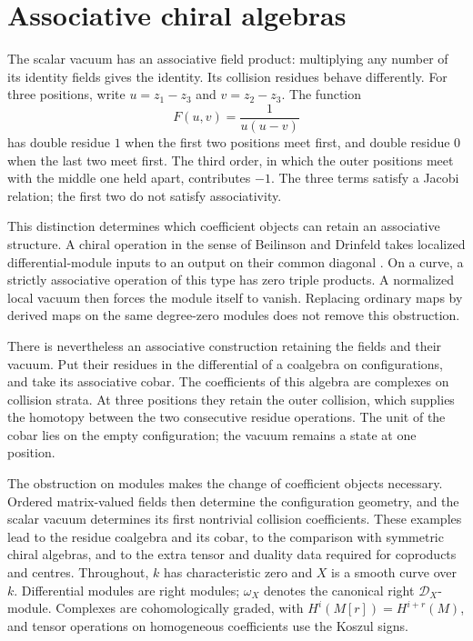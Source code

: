 \chapter{Associative chiral algebras}
\label{e1f:chapter}

The scalar vacuum has an associative field product: multiplying
any number of its identity fields gives the identity. Its collision
residues\label{e1f:def:scalar-three-point-coordinates} behave differently. For three positions, write
\(u=z_1-z_3\) and \(v=z_2-z_3\). The function
\[
 F(u,v)=\frac1{u(u-v)}
\]
has double residue \(1\) when the first two positions meet first,
and double residue \(0\) when the last two meet first. The third
order, in which the outer positions meet with the middle one held
apart, contributes \(-1\). The three terms satisfy a Jacobi
relation; the first two do not satisfy associativity.

This distinction determines which coefficient objects can retain
an associative structure. A chiral operation in the sense of Beilinson and
Drinfeld takes localized differential-module inputs to an output
on their common diagonal \cite{chhop:BD}. On a curve, a strictly
associative operation of this type has zero triple products.
A normalized local vacuum then forces the module itself to vanish.
Replacing ordinary maps by derived maps on the same degree-zero
modules does not remove this obstruction.

There is nevertheless an associative construction retaining the
fields and their vacuum. Put their residues in the differential
of a coalgebra on configurations, and take its associative cobar.
The coefficients of this algebra are complexes on collision
strata. At three positions they retain the outer collision,
which supplies the homotopy between the two consecutive residue
operations. The unit of the cobar lies on the empty configuration;
the vacuum remains a state at one position.

The obstruction on modules makes the change of coefficient
objects necessary. Ordered
matrix-valued fields then determine the configuration geometry,
and the scalar vacuum determines its first nontrivial collision
coefficients. These examples lead to the residue coalgebra and
its cobar, to the comparison with symmetric chiral algebras, and
to the extra tensor and duality data required for coproducts and
centres. Throughout, \(k\) has characteristic zero and \(X\) is a
smooth curve over \(k\). Differential modules are right modules;
\(\omega_X\) denotes the canonical right \(\mathcal D_X\)-module.
Complexes are cohomologically graded, with
\(H^i(M[r])=H^{i+r}(M)\), and tensor operations on
homogeneous coefficients use the Koszul signs.

